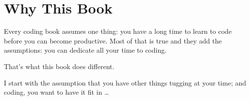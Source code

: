 \section{Why This Book}\label{sec:why-this-book}

Every coding book assumes one thing: you have a long time to learn to code before you can become productive. Most of that is true and they add the assumptions: you can dedicate all your time to coding.

That’s what this book does different.

I start with the assumption that you have other things tugging at your time; and coding, you want to have it fit in \ldots

